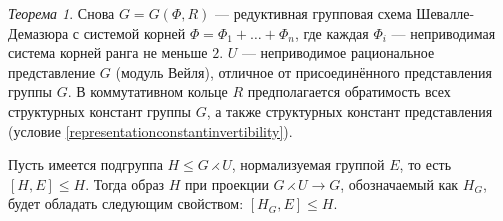 \documentclass[10pt]{article}
\theoremstyle{remark}
\newtheorem{thm}{Теорема}
\renewcommand{\le}{\leqslant}
\begin{document}
\begin{thm}
  Снова $G = G(\Phi, R)$ --- редуктивная групповая схема Шевалле-Демазюра
  с системой корней $\Phi = \Phi_1 + \ldots + \Phi_n$, где каждая $\Phi_i$ --- неприводимая система корней ранга не меньше $2$. $U$ --- неприводимое рациональное представление $G$ (модуль Вейля), отличное от присоединённого представления группы $G$. В коммутативном кольце $R$ предполагается обратимость всех структурных констант группы $G$, а также структурных констант представления (условие \ref{representationconstantinvertibility}).
    
  Пусть имеется подгруппа $H \le G \rightthreetimes U$, нормализуемая группой $E$, то есть $[H,E] \le H$. Тогда образ $H$ при проекции $G \rightthreetimes U \rightarrow G$, обозначаемый как $H_G$, будет обладать следующим свойством: $[H_G,E]\le H$.
\end{thm}
\end{document}
